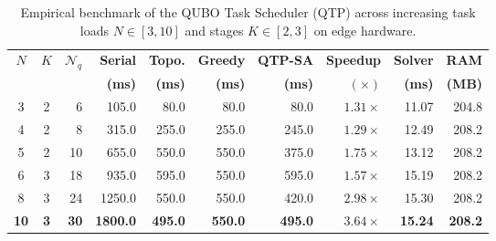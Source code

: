 \documentclass[review,12pt,times,authoryear]{elsarticle}
\theoremstyle{definition}
\begin{document}
\begin{table}[t]
\centering
\small
\renewcommand{\arraystretch}{1.15}
\caption{Empirical benchmark of the QUBO Task Scheduler (QTP) across increasing task loads $N \in [3, 10]$ and stages $K \in [2, 3]$ on edge hardware.}
\label{tab:qtp_metrics}
\begin{tabular*}{\columnwidth}{@{\extracolsep{\fill}}ccrrrrrrrr@{}}
\toprule
$N$ & $K$ & $\mathcal{N}_q$ & \textbf{Serial} & \textbf{Topo.} & \textbf{Greedy} & \textbf{QTP-SA} & \textbf{Speedup} & \textbf{Solver} & \textbf{RAM} \\
    &     &                 & \textbf{(ms)}   & \textbf{(ms)}   & \textbf{(ms)}   & \textbf{(ms)}   & $\mathbf{(\times)}$ & \textbf{(ms)} & \textbf{(MB)} \\
\midrule
3  & 2 &  6 &  105.0 &  80.0 &  80.0 &  80.0 & $1.31\times$ & 11.07 & 204.8 \\
4  & 2 &  8 &  315.0 & 255.0 & 255.0 & 245.0 & $1.29\times$ & 12.49 & 208.2 \\
5  & 2 & 10 &  655.0 & 550.0 & 550.0 & 375.0 & $1.75\times$ & 13.12 & 208.2 \\
6  & 3 & 18 &  935.0 & 595.0 & 550.0 & 595.0 & $1.57\times$ & 15.19 & 208.2 \\
8  & 3 & 24 & 1250.0 & 550.0 & 550.0 & 420.0 & $2.98\times$ & 15.30 & 208.2 \\
\textbf{10} & \textbf{3} & \textbf{30} & \textbf{1800.0} & \textbf{495.0} & \textbf{550.0} & \textbf{495.0} & $\mathbf{3.64\times}$ & \textbf{15.24} & \textbf{208.2} \\
\bottomrule
\end{tabular*}
\end{table}
\end{document}
